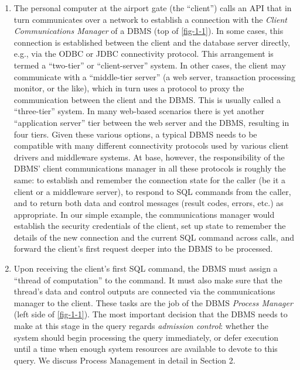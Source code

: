 \documentclass[b5paper,11pt,twoside,openright]{book}
\begin{document}
\begin{enumerate}
\def\labelenumi{\arabic{enumi}.}

\item
  The personal computer at the airport gate (the ``client'') calls an
  API that in turn communicates over a network to establish a connection
  with the \emph{Client Communications Manager} of a DBMS (top of \autoref{fig-1-1}). In some cases, this connection is established between the client
  and the database server directly, e.g., via the ODBC or JDBC
  connectivity protocol. This arrangement is termed a ``two-tier'' or
  ``client-server'' system. In other cases, the client may communicate
  with a ``middle-tier server'' (a web server, transaction processing
  monitor, or the like), which in turn uses a protocol to proxy the
  communication between the client and the DBMS. This is usually called
  a ``three-tier'' system. In many web-based scenarios there is yet
  another ``application server'' tier between the web server and the
  DBMS, resulting in four tiers. Given these various options, a typical
  DBMS needs to be compatible with many different connectivity protocols
  used by various client drivers and middleware systems. At base,
  however, the responsibility of the DBMS' client communications manager
  in all these protocols is roughly the same: to establish and remember
  the connection state for the caller (be it a client or a middleware
  server), to respond to SQL commands from the caller, and to return
  both data and control messages (result codes, errors, etc.) as
  appropriate. In our simple example, the communications manager would
  establish the security credentials of the client, set up state to
  remember the details of the new connection and the current SQL command
  across calls, and forward the client's first request deeper into the
  DBMS to be processed.
\item
  Upon receiving the client's first SQL command, the DBMS must assign a
  ``thread of computation'' to the command. It must also make sure that
  the thread's data and control outputs are connected via the
  communications manager to the client. These tasks are the job of the
  DBMS \emph{Process Manager} (left side of \autoref{fig-1-1}). The most
  important decision that the DBMS needs to make at this stage in the
  query regards \emph{admission control}: whether the system should
  begin processing the query immediately, or defer execution until a
  time when enough system resources are available to devote to this
  query. We discuss Process Management in detail in Section 2.

\end{enumerate}
\end{document}
